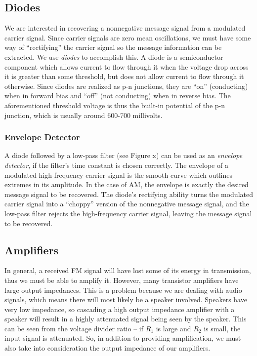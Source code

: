 \documentclass[11pt]{article}
\begin{document}
    \subsection{Diodes}
    We are interested in recovering a nonnegative message signal from a modulated carrier signal. Since carrier signals are zero mean oscillations, we must have some way of ``rectifying'' the carrier signal so the message information can be extracted. We use \emph{diodes} to accomplish this. A diode is a semiconductor component which allows current to flow through it when the voltage drop across it is greater than some threshold, but does not allow current to flow through it otherwise. Since diodes are realized as p-n junctions, they are ``on'' (conducting) when in forward bias and ``off'' (not conducting) when in reverse bias. The aforementioned threshold voltage is thus the built-in potential of the p-n junction, which is usually around 600-700 millivolts.

        \subsubsection{Envelope Detector}
        A diode followed by a low-pass filter (see Figure x) can be used as an \emph{envelope detector}, if the filter's time constant is chosen correctly. The envelope of a modulated high-frequency carrier signal is the smooth curve which outlines extremes in its amplitude. In the case of AM, the envelope is exactly the desired message signal to be recovered. The diode's rectifying ability turns the modulated carrier signal into a ``choppy'' version of the nonnegative message signal, and the low-pass filter rejects the high-frequency carrier signal, leaving the message signal to be recovered.

    \subsection{Amplifiers}
    In general, a received FM signal will have lost some of its energy in transmission, thus we must be able to amplify it. However, many transistor amplifiers have large output impedances. This is a problem because we are dealing with audio signals, which means there will most likely be a speaker involved. Speakers have very low impedance, so cascading a high output impedance amplifier with a speaker will result in a highly attenuated signal being seen by the speaker. This can be seen from the voltage divider ratio -- if $R_1$ is large and $R_2$ is small, the input signal is attenuated. So, in addition to providing amplification, we must also take into consideration the output impedance of our amplifiers.
\end{document}
